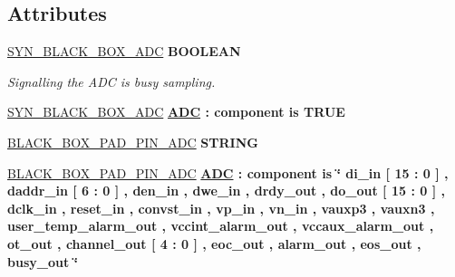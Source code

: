 \subsection*{Attributes}
 \begin{DoxyCompactItemize}
\item 
\hypertarget{classADC__TOP_1_1Behavioral_a32f4997bcfad751ba77794903af40d92}{\hyperlink{classADC__TOP_1_1Behavioral_a32f4997bcfad751ba77794903af40d92}{S\-Y\-N\-\_\-\-B\-L\-A\-C\-K\-\_\-\-B\-O\-X\-\_\-\-A\-D\-C} {\bfseries \textcolor{comment}{B\-O\-O\-L\-E\-A\-N}\textcolor{vhdlchar}{ }} }\label{classADC__TOP_1_1Behavioral_a32f4997bcfad751ba77794903af40d92}

\begin{DoxyCompactList}\small\item\em Signalling the A\-D\-C is busy sampling. \end{DoxyCompactList}\item 
\hypertarget{classADC__TOP_1_1Behavioral_a737609c62913b04be3bb776fbce18464}{\hyperlink{classADC__TOP_1_1Behavioral_a737609c62913b04be3bb776fbce18464}{S\-Y\-N\-\_\-\-B\-L\-A\-C\-K\-\_\-\-B\-O\-X\-\_\-\-A\-D\-C} {\bfseries {\bfseries \hyperlink{classADC__TOP_1_1Behavioral_ad251174263b28388454816799ffd91ae}{A\-D\-C}} \textcolor{vhdlchar}{ }\textcolor{vhdlchar}{\-:}\textcolor{vhdlchar}{ }\textcolor{vhdlkeyword}{component}\textcolor{vhdlchar}{ }\textcolor{vhdlkeyword}{is}\textcolor{vhdlchar}{ }\textcolor{vhdlchar}{T\-R\-U\-E}\textcolor{vhdlchar}{ }} }\label{classADC__TOP_1_1Behavioral_a737609c62913b04be3bb776fbce18464}

\item 
\hypertarget{classADC__TOP_1_1Behavioral_a05f1935151676cf5c0d14df52f28c3b1}{\hyperlink{classADC__TOP_1_1Behavioral_a05f1935151676cf5c0d14df52f28c3b1}{B\-L\-A\-C\-K\-\_\-\-B\-O\-X\-\_\-\-P\-A\-D\-\_\-\-P\-I\-N\-\_\-\-A\-D\-C} {\bfseries \textcolor{comment}{S\-T\-R\-I\-N\-G}\textcolor{vhdlchar}{ }} }\label{classADC__TOP_1_1Behavioral_a05f1935151676cf5c0d14df52f28c3b1}

\item 
\hypertarget{classADC__TOP_1_1Behavioral_a731a305d96f244bae6982ef51e5298be}{\hyperlink{classADC__TOP_1_1Behavioral_a731a305d96f244bae6982ef51e5298be}{B\-L\-A\-C\-K\-\_\-\-B\-O\-X\-\_\-\-P\-A\-D\-\_\-\-P\-I\-N\-\_\-\-A\-D\-C} {\bfseries {\bfseries \hyperlink{classADC__TOP_1_1Behavioral_ad251174263b28388454816799ffd91ae}{A\-D\-C}} \textcolor{vhdlchar}{ }\textcolor{vhdlchar}{\-:}\textcolor{vhdlchar}{ }\textcolor{vhdlkeyword}{component}\textcolor{vhdlchar}{ }\textcolor{vhdlkeyword}{is}\textcolor{vhdlchar}{ }\textcolor{keyword}{\char`\"{} di\-\_\-in \mbox{[} 15 \-: 0 \mbox{]} , daddr\-\_\-in \mbox{[} 6 \-: 0 \mbox{]} , den\-\_\-in , dwe\-\_\-in , drdy\-\_\-out , do\-\_\-out \mbox{[} 15 \-: 0 \mbox{]} , dclk\-\_\-in , reset\-\_\-in , convst\-\_\-in , vp\-\_\-in , vn\-\_\-in , vauxp3 , vauxn3 , user\-\_\-temp\-\_\-alarm\-\_\-out , vccint\-\_\-alarm\-\_\-out , vccaux\-\_\-alarm\-\_\-out , ot\-\_\-out , channel\-\_\-out \mbox{[} 4 \-: 0 \mbox{]} , eoc\-\_\-out , alarm\-\_\-out , eos\-\_\-out , busy\-\_\-out \char`\"{}}\textcolor{vhdlchar}{ }} }\label{classADC__TOP_1_1Behavioral_a731a305d96f244bae6982ef51e5298be}

\end{DoxyCompactItemize}

